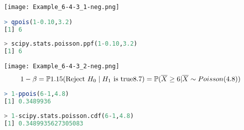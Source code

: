 \begin{frame}[fragile]
\begin{center}
\texttt{[image: Example\_6-4-3\_1-neg.png]}
\vfill

\begin{minipage}{0.25\textwidth}
\begin{center}
\begin{lstlisting}[language=R]
> qpois(1-0.10,3.2)
[1] 6
\end{lstlisting}
\end{center}
\end{minipage}
\quad
\begin{minipage}{0.5\textwidth}
\begin{center}
\begin{lstlisting}[language=Python]
> scipy.stats.poisson.ppf(1-0.10,3.2)
[1] 6
\end{lstlisting}
\end{center}
\end{minipage}
\end{center}
\end{frame}
\begin{frame}[fragile]
\begin{center}
\texttt{[image: Example\_6-4-3\_2-neg.png]}
\[
	1-\beta = \mathbb{P}1.15(\text{Reject $H_0$}\mid \text{$H_1$ is true}8.7)
	=\mathbb{P}(\overline{X}\ge 6|\overline{X}\sim Poisson(4.8))
\]
\myEnd
\bigskip

\begin{minipage}{0.25\textwidth}
\begin{center}
\begin{lstlisting}[language=R]
> 1-ppois(6-1,4.8)
[1] 0.3489936
\end{lstlisting}
\end{center}
\end{minipage}
\qquad
\begin{minipage}{0.45\textwidth}
\begin{center}
\begin{lstlisting}[language=Python]
> 1-scipy.stats.poisson.cdf(6-1,4.8)
[1] 0.3489935627305083
\end{lstlisting}
\end{center}
\end{minipage}
\end{center}
\end{frame}
